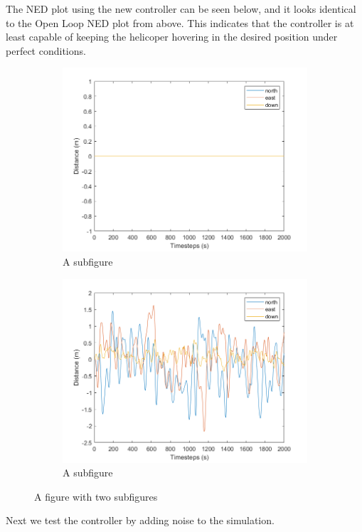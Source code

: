 \documentclass{article}
\begin{document}

The NED plot using the new controller can be seen below, and it looks identical to the Open Loop NED plot from above. This indicates that the controller is at least capable of keeping the helicoper hovering in the desired position under perfect conditions.

\begin{figure}[h]
\centering
\begin{subfigure}{.5\textwidth}
  \centering
  \includegraphics[width=.4\linewidth]{kss_hover}
  \caption{A subfigure}
  \label{fig:sub1}
\end{subfigure}%
\begin{subfigure}{.5\textwidth}
  \centering
  \includegraphics[width=.3\linewidth]{kss_hover_noise}
  \caption{A subfigure}
  \label{fig:sub2}
\end{subfigure}
\caption{A figure with two subfigures}
\label{fig:test}
\end{figure}


Next we test the controller by adding noise to the simulation. 

\end{document}
